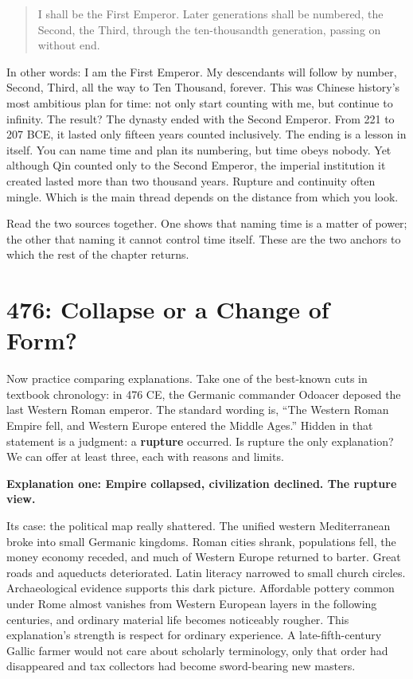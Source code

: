 \begin{quote}
I shall be the First Emperor. Later generations shall be numbered, the Second, the Third, through the ten-thousandth generation, passing on without end.
\end{quote}
In other words: I am the First Emperor. My descendants will follow by number, Second, Third, all the way to Ten Thousand, forever. This was Chinese history's most ambitious plan for time: not only start counting with me, but continue to infinity. The result? The dynasty ended with the Second Emperor. From 221 to 207 BCE, it lasted only fifteen years counted inclusively. The ending is a lesson in itself. You can name time and plan its numbering, but time obeys nobody. Yet although Qin counted only to the Second Emperor, the imperial institution it created lasted more than two thousand years. Rupture and continuity often mingle. Which is the main thread depends on the distance from which you look.

Read the two sources together. One shows that naming time is a matter of power; the other that naming it cannot control time itself. These are the two anchors to which the rest of the chapter returns.

\section{476: Collapse or a Change of Form?}
Now practice comparing explanations. Take one of the best-known cuts in textbook chronology: in 476 CE, the Germanic commander Odoacer deposed the last Western Roman emperor. The standard wording is, ``The Western Roman Empire fell, and Western Europe entered the Middle Ages.'' Hidden in that statement is a judgment: a \textbf{rupture} occurred. Is rupture the only explanation? We can offer at least three, each with reasons and limits.

\textbf{Explanation one: Empire collapsed, civilization declined. The rupture view.}

Its case: the political map really shattered. The unified western Mediterranean broke into small Germanic kingdoms. Roman cities shrank, populations fell, the money economy receded, and much of Western Europe returned to barter. Great roads and aqueducts deteriorated. Latin literacy narrowed to small church circles. Archaeological evidence supports this dark picture. Affordable pottery common under Rome almost vanishes from Western European layers in the following centuries, and ordinary material life becomes noticeably rougher. This explanation's strength is respect for ordinary experience. A late-fifth-century Gallic farmer would not care about scholarly terminology, only that order had disappeared and tax collectors had become sword-bearing new masters.

